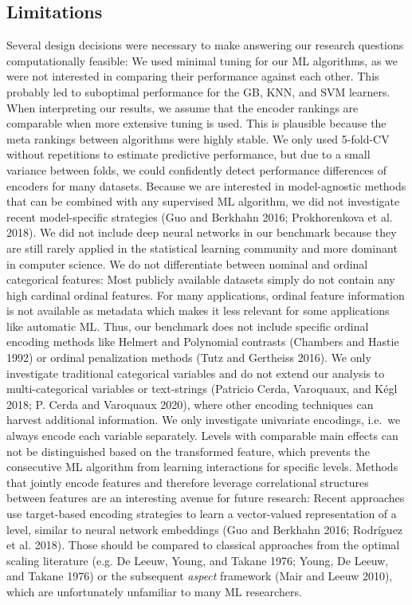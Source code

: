 \documentclass[smallextended]{svjour3}       %
\begin{document}
\hypertarget{limitations}{%
\subsection{Limitations}\label{limitations}}

Several design decisions were necessary to make answering our research questions computationally feasible:
We used minimal tuning for our ML algorithms, as we were not interested in comparing their performance against each other.
This probably led to suboptimal performance for the GB, KNN, and SVM learners.
When interpreting our results, we assume that the encoder rankings are comparable when more extensive tuning is used.
This is plausible because the meta rankings between algorithms were highly stable.
We only used 5-fold-CV without repetitions to estimate predictive performance, but due to a small variance between folds, we could confidently detect performance differences of encoders for many datasets.
Because we are interested in model-agnostic methods that can be combined with any supervised ML algorithm, we did not investigate recent model-specific strategies (Guo and Berkhahn 2016; Prokhorenkova et al. 2018).
We did not include deep neural networks in our benchmark because they are still rarely applied in the statistical learning community and more dominant in computer science.
We do not differentiate between nominal and ordinal categorical features:
Most publicly available datasets simply do not contain any high cardinal ordinal features.
For many applications, ordinal feature information is not available as metadata which makes it less relevant for some applications like automatic ML.
Thus, our benchmark does not include specific ordinal encoding methods like Helmert and Polynomial contrasts (Chambers and Hastie 1992) or ordinal penalization methods (Tutz and Gertheiss 2016).
We only investigate traditional categorical variables and do not extend our analysis to multi-categorical variables or text-strings (Patricio Cerda, Varoquaux, and Kégl 2018; P. Cerda and Varoquaux 2020), where other encoding techniques can harvest additional information.
We only investigate univariate encodings, i.e.~we always encode each variable separately.
Levels with comparable main effects can not be distinguished based on the transformed feature, which prevents the consecutive ML algorithm from learning interactions for specific levels.
Methods that jointly encode features and therefore leverage correlational structures between features are an interesting avenue for future research:
Recent approaches use target-based encoding strategies to learn a vector-valued representation of a level, similar to neural network embeddings (Guo and Berkhahn 2016; Rodríguez et al. 2018).
Those should be compared to classical approaches from the optimal scaling literature (e.g. De Leeuw, Young, and Takane 1976; Young, De Leeuw, and Takane 1976) or the subsequent \emph{aspect} framework (Mair and Leeuw 2010), which are unfortunately unfamiliar to many ML researchers.
\end{document}
